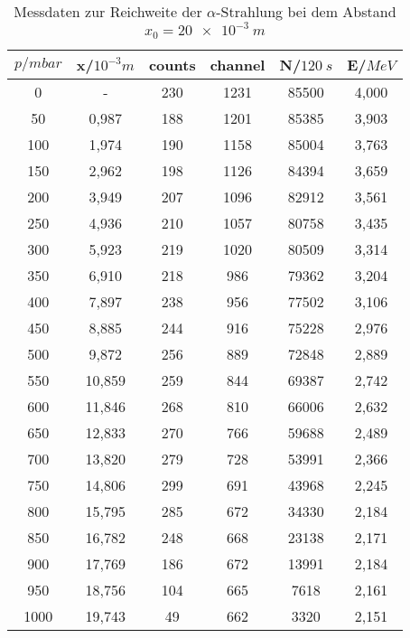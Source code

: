 \begin{table}[h!]
  \centering
  \caption{Messdaten zur Reichweite der $\alpha$-Strahlung bei dem Abstand $x_{\text{0}}=\SI{20e-3}{m}$}
  \label{tab:reichweite20}
  \begin{tabular}{c c c c c c}
    \toprule
      $p/mbar$ & x/$10^{-3}m$ & counts &  channel &  N/$\SI{120}{s}$  &  E/$MeV$ \\
      \midrule
         0     &   -      &  230    &  1231    &    85500   &  4,000  \\
        50     &   0,987  &  188    &  1201    &    85385   &  3,903  \\
       100     &   1,974  &  190    &  1158    &    85004   &  3,763  \\
       150     &   2,962  &  198    &  1126    &    84394   &  3,659  \\
       200     &   3,949  &  207    &  1096    &    82912   &  3,561  \\
       250     &   4,936  &  210    &  1057    &    80758   &  3,435  \\
       300     &   5,923  &  219    &  1020    &    80509   &  3,314  \\
       350     &   6,910  &  218    &   986    &    79362   &  3,204  \\
       400     &   7,897  &  238    &   956    &    77502   &  3,106  \\
       450     &   8,885  &  244    &   916    &    75228   &  2,976  \\
       500     &   9,872  &  256    &   889    &    72848   &  2,889  \\
       550     &  10,859  &  259    &   844    &    69387   &  2,742  \\
       600     &  11,846  &  268    &   810    &    66006   &  2,632  \\
       650     &  12,833  &  270    &   766    &    59688   &  2,489  \\
       700     &  13,820  &  279    &   728    &    53991   &  2,366  \\
       750     &  14,806  &  299    &   691    &    43968   &  2,245  \\
       800     &  15,795  &  285    &   672    &    34330   &  2,184  \\
       850     &  16,782  &  248    &   668    &    23138   &  2,171  \\
       900     &  17,769  &  186    &   672    &    13991   &  2,184  \\
       950     &  18,756  &  104    &   665    &     7618   &  2,161  \\
      1000     &  19,743  &   49    &   662    &     3320   &  2,151  \\


    \bottomrule
  \end{tabular}
\end{table}

%

